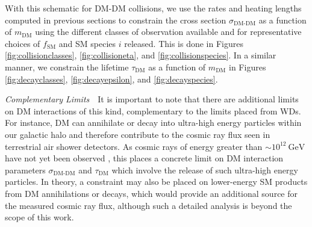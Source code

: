 \documentclass[twocolumn, preprintnumbers,amsmath,amssymb,prd, superscriptaddress]{revtex4}
\newcommand{\GeV}{\text{GeV}}
\begin{document}
With this schematic for DM-DM collisions, we use the rates and heating lengths computed in previous sections to constrain the cross section $\sigma_\text{DM-DM}$ as a function of $m_\text{DM}$ using the different classes of observation available and for representative choices of $f_\text{SM}$ and SM species $i$ released.
This is done in Figures \ref{fig:collisionclasses}, \ref{fig:collisioneta}, and \ref{fig:collisionspecies}.
In a similar manner, we constrain the lifetime $\tau_\text{DM}$ as a function of $m_\text{DM}$ in Figures \ref{fig:decayclasses}, \ref{fig:decayepsilon}, and \ref{fig:decayspecies}.


\emph{Complementary Limits}~~It is important to note that there are additional limits on DM interactions of this kind, complementary to the limits placed from WDs.
For instance, DM can annihilate or decay into ultra-high energy particles within our galactic halo and therefore contribute to the cosmic ray flux seen in terrestrial air shower detectors.
As cosmic rays of energy greater than $\sim 10^{12} ~\GeV$ have not yet been observed \cite{ThePierreAuger:2015rha, AbuZayyad:2012ru}, this places a concrete limit on DM interaction parameters $\sigma_\text{DM-DM}$ and $\tau_\text{DM}$ which involve the release of such ultra-high energy particles.
In theory, a constraint may also be placed on lower-energy SM products from DM annihilations or decays, which would provide an additional source for the measured cosmic ray flux, although such a detailed analysis is beyond the scope of this work.
\end{document}
